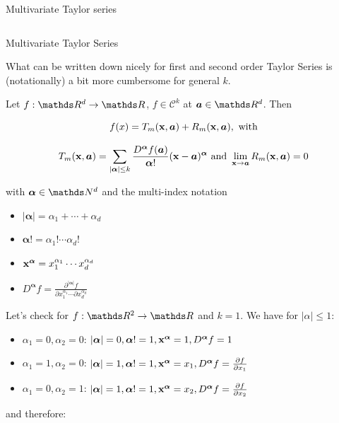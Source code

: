 \begin{vbframe}{Multivariate Taylor series}
\begin{columns}
\begin{column}{0.3\textwidth}
    \end{column}
  \end{columns}  


\end{vbframe}


\begin{vbframe}{Multivariate Taylor Series}  

What can be written down nicely for first and second order Taylor Series is (notationally) a bit more cumbersome for general $k$.

\lz 

Let $f: \R^d \to \R$, $f \in \mathcal{C}^k$ at $\bm{a} \in \R^d$. Then 

$$
  f(x) = T_m(\mathbf{x}, \bm{a}) + R_m(\mathbf{x}, \bm{a}), \text{ with}
$$

$$
  T_m(\mathbf{x},\bm{a}) = \sum_{|\bm{\alpha}| \le k} \frac{D^{\bm{\alpha}} f(\bm{a})}{{\bm{\alpha}}!} (\mathbf{x} - \bm{a})^{\bm{\alpha}} \text{ and } \lim_{\mathbf{x} \to \bm{a}} R_m(\mathbf{x},\bm{a}) = 0
$$

with $\bm{\alpha} \in \N^d$ and the multi-index notation
\begin{itemize}
  \item $|\bm{\alpha}| = \alpha_1 + \cdots + \alpha_d$
  \item $\bm{\alpha}! = \alpha_1! \cdots \alpha_d!$
  \item $\mathbf{x}^{\bm{\alpha}} = x_1^{\alpha_1} \cdots x_d^{\alpha_d}$
  \item $D^{\bm{\alpha}} f = \frac{\partial^{|\bm{\alpha}|} f}{\partial x_1^{\alpha_1} \cdots \partial x_d^{\alpha_d}}$ 
\end{itemize}

\framebreak 

Let's check for $f: \R^2 \to \R$ and $k = 1$. We have for $|\alpha| \le 1$: 

\begin{itemize}
  \item $\alpha_1 = 0, \alpha_2 = 0$: $|\bm{\alpha}| = 0, \bm{\alpha}! = 1, \mathbf{x}^{\bm{\alpha}} = 1, D^{\bm{\alpha}} f = 1$
  \item $\alpha_1 = 1, \alpha_2 = 0$: $|\bm{\alpha}| = 1, \bm{\alpha}! = 1, \mathbf{x}^{\bm{\alpha}} = x_1, D^{\bm{\alpha}} f = \frac{\partial f}{\partial x_1}$
  \item $\alpha_1 = 0, \alpha_2 = 1$: $|\bm{\alpha}| = 1, \bm{\alpha}! = 1, \mathbf{x}^{\bm{\alpha}} = x_2, D^{\bm{\alpha}} f = \frac{\partial f}{\partial x_2}$
\end{itemize}

and therefore: 


\end{vbframe}
